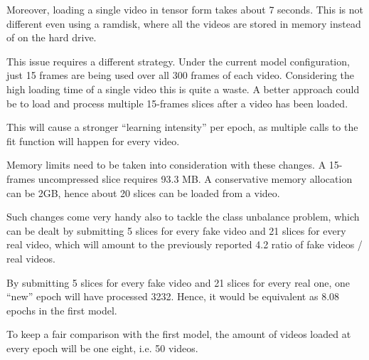 Moreover, loading a single video in tensor form takes about 7 seconds.
This is not different even using a ramdisk, where all the videos are stored in
memory instead of on the hard drive.

This issue requires a different strategy. Under the current model configuration,
just 15 frames are being used over all 300 frames of each video. Considering the
high loading time of a single video this is quite a waste.
A better approach could be to load and process multiple 15-frames slices after a video
has been loaded.

This will cause a stronger ``learning intensity'' per epoch, as multiple calls to
the fit function will happen for every video.

Memory limits need to be taken into consideration with these changes.
A 15-frames uncompressed slice requires 93.3 MB. A conservative memory allocation
can be 2GB, hence about 20 slices can be loaded from a video.

Such changes come very handy also to tackle the class unbalance problem, which can
be dealt by submitting 5 slices for every fake video and 21 slices for every real
video, which will amount to the previously reported 4.2 ratio of fake videos / real videos.

By submitting 5 slices for every fake video and 21 slices for every real one, one ``new'' 
epoch will have processed 3232. Hence, it would be equivalent as $8.08$ epochs in the 
first model.

To keep a fair comparison with the first model, the amount of videos loaded at every epoch
will be one eight, i.e. 50 videos.
